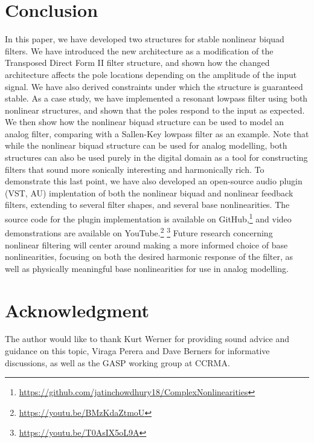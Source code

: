 \documentclass{IEEEtran}
\begin{document}
\section{Conclusion}

In this paper, we have developed two structures for stable nonlinear biquad
filters. We have introduced the new architecture as a modification of the
Transposed Direct Form II filter structure, and shown
how the changed architecture affects the pole locations depending on
the amplitude of the input signal. We have also derived constraints under
which the structure is guaranteed stable.
\newline\newline
As a case study, we have implemented
a resonant lowpass filter using both nonlinear
structures, and shown that the
poles respond to the input as expected. We then show how the
nonlinear biquad structure can be used to model an analog
filter, comparing with a Sallen-Key lowpass filter as
an example. Note that while the nonlinear biquad structure
can be used for analog modelling, both structures can also be
used purely in the digital domain as a tool for constructing
filters that sound more sonically interesting and harmonically
rich.
\newline\newline
To demonstrate this last point, we have also developed an open-source
audio plugin (VST, AU) implentation of both the nonlinear biquad and
nonlinear feedback filters, extending to several filter shapes, and
several base nonlinearities.
The source code for the plugin implementation is available on
GitHub,\footnote{\url{https://github.com/jatinchowdhury18/ComplexNonlinearities}}
and video demonstrations are available on YouTube.\footnote{\url{https://youtu.be/BMzKdaZtmoU}}
\footnote{\url{https://youtu.be/T0AsIX5oL9A}}
\newline\newline
Future research concerning nonlinear filtering will center around making a
more informed choice of base nonlinearities, focusing on both the desired
harmonic response of the filter, as well as physically meaningful base
nonlinearities for use in analog modelling.

\section*{Acknowledgment}

The author would like to thank Kurt Werner for providing sound advice and
guidance on this topic, Viraga Perera and Dave Berners for informative
discussions, as well as the GASP working group at CCRMA.
\end{document}
